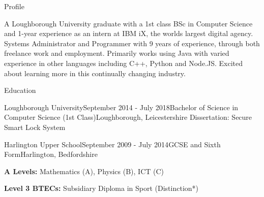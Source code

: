 \documentclass{resume} %
\begin{document}

\begin {rSection}{Profile}

A Loughborough University graduate with a 1st class BSc in Computer Science and 1-year experience as an intern at IBM iX, the worlds largest digital agency. Systems Administrator and Programmer with 9 years of experience, through both freelance work and employment. Primarily works using Java with varied experience in other languages including C++, Python and Node.JS. Excited about learning more in this continually changing industry.

\end{rSection}


\begin{rSection}{Education}

\begin{rSubsection}{Loughborough University}{September 2014 - July 2018}{Bachelor of Science in Computer Science (1st Class)}{Loughborough, Leicestershire}
Dissertation: Secure Smart Lock System
\end{rSubsection}

\begin{rSubsection}{Harlington Upper School}{September 2009 - July 2014}{GCSE and Sixth Form}{Harlington, Bedfordshire}
\item \textbf{A Levels: } Mathematics (A), Physics (B), ICT (C)
\item \textbf{Level 3 BTECs: } Subsidiary Diploma in Sport (Distinction*)
\end{rSubsection}
\end{rSection}

\end{document}
